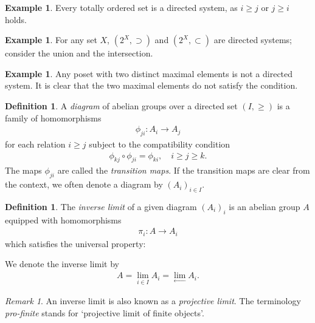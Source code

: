\documentclass[12pt]{report}
\theoremstyle{plain}
\theoremstyle{remark}
\newtheorem*{remark}{Remark}
\theoremstyle{definition}
\newtheorem{definition}[theorem]{Definition}
\newtheorem{example}[theorem]{Example}
\begin{document}
\begin{example}
    Every totally ordered set is a directed system, as $i\ge j$ or $j\ge i$ holds.
\end{example}

\begin{example}
    For any set $X$, $(2^X,\supset)$ and $(2^X,\subset)$ are directed systems; consider the union and the intersection.
\end{example}

\begin{example}
    Any poset with two distinct maximal elements is not a directed system. It is clear that the two maximal elements do not satisfy the condition.
\end{example}

\begin{definition}
    A \emph{diagram} of abelian groups over a directed set $(I,\ge)$ is a family of homomorphisms
    \begin{align*}
        \phi_{ji}:A_i\rightarrow A_j
    \end{align*}
    for each relation $i\ge j$ subject to the compatibility condition
    \begin{align*}
        \phi_{kj}\circ \phi_{ji} = \phi_{ki},\quad i\ge j\ge k.
    \end{align*}
    The maps $\phi_{ji}$ are called the \emph{transition maps}. If the transition maps are clear from the context, we often denote a diagram by $(A_i)_{i\in I}$.
\end{definition}

\begin{definition}
    The \emph{inverse limit} of a given diagram $(A_i)_i$ is an abelian group $A$ equipped with homomorphisms
    \begin{align*}
        \pi_i:A\rightarrow A_i
    \end{align*}
    which satisfies the universal property:
    \begin{figure}[H]
    \centering
    \end{figure}
    \noindent
    We denote the inverse limit by
    \begin{align*}
        A = \lim_{i\in I} A_i = \lim_{\leftarrow} A_i.
    \end{align*}
\end{definition}
\begin{remark}
    An inverse limit is also known as a \emph{projective limit}. The terminology \emph{pro-finite} stands for `projective limit of finite objects'.
\end{remark}
\end{document}

